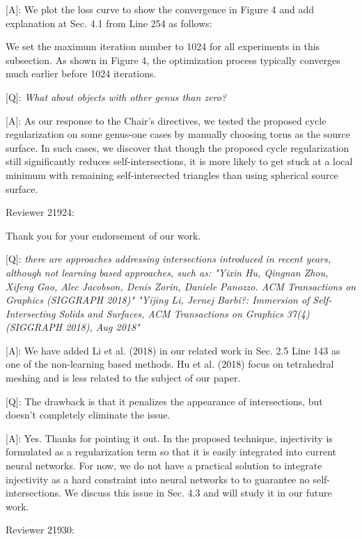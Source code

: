 \documentclass[10pt]{letter} %
\newcommand{\mdf}[1]{\textcolor[rgb]{1.00,0.00,1.00}{#1}}
\begin{document}
	[A]: We plot the loss curve to show the convergence in Figure 4 and add explanation at Sec. 4.1 from Line 254 as follows:
	
	\mdf{We set the maximum iteration number to 1024 for all experiments in this subsection. As shown in Figure 4, the optimization process typically converges much earlier before 1024 iterations.}
	
	[Q]: \emph{What about objects with other genus than zero?}
	
	[A]: As our response to the Chair's directives, we tested the proposed cycle regularization on some genus-one cases by manually choosing torus as the source surface. In such cases, we discover that though the proposed cycle regularization still significantly reduces self-intersections, it is more likely to get stuck at a local minimum with remaining self-intersected triangles than using spherical source surface.   
	 
	\hdashrule{\linewidth}{1pt}{1mm}
	Reviewer 21924:
	
	Thank you for your endorsement of our work.
	
	[Q]: \emph{there are approaches addressing intersections introduced in recent years, although not learning based approaches, such as:
	"Yixin Hu, Qingnan Zhou, Xifeng Gao, Alec Jacobson, Denis Zorin, Daniele Panozzo. ACM Transactions on Graphics (SIGGRAPH 2018)"
	"Yijing Li, Jernej Barbi?: Immersion of Self-Intersecting Solids and Surfaces, ACM Transactions on Graphics 37(4) (SIGGRAPH 2018), Aug 2018"}
	
	[A]: We have added Li et al. (2018) in our related work in Sec. 2.5 Line 143 as one of the non-learning based methods. Hu et al. (2018) focus on tetrahedral meshing and is less related to the subject of our paper.
	
	[Q]: The drawback is that it penalizes the appearance of intersections, but doesn't completely eliminate the issue.
	
	[A]: Yes. Thanks for pointing it out. In the proposed technique, injectivity is formulated as a regularization term so that it is easily integrated into current neural networks. For now, we do not have a practical solution to integrate injectivity as a  hard constraint into neural networks to to guarantee no self-intersections. We discuss this issue in Sec. 4.3 and will study it in our future work. 
	
	\hdashrule{\linewidth}{1pt}{1mm}
	Reviewer 21930:
	
\end{document}
